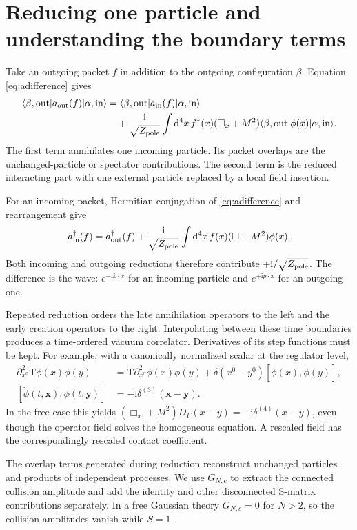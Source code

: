 \documentclass[11pt]{article}
\newcommand{\dd}{\mathrm d}
\newcommand{\ii}{\mathrm i}
\newcommand{\Tord}{\mathrm T}
\newcommand{\module}[1]{\clearpage\section{#1}}
\newcommand{\Zp}{Z_{\rm pole}}
\begin{document}
\module{Reducing one particle and understanding the boundary terms}
Take an outgoing packet \(f\) in addition to the outgoing configuration
\(\beta\). Equation \eqref{eq:adifference} gives
\begin{align}
 \langle\beta,\mathrm{out}|a_{\rm out}(f)|\alpha,\mathrm{in}\rangle
 &=\langle\beta,\mathrm{out}|a_{\rm in}(f)|\alpha,\mathrm{in}\rangle\notag\\
 &\quad+\frac{\ii}{\sqrt{\Zp}}\int\dd^4x\,f^*(x)
 (\Box_x+M^2)\langle\beta,\mathrm{out}|\phi(x)|\alpha,\mathrm{in}\rangle.
 \label{eq:oneleg}
\end{align}
The first term annihilates one incoming particle. Its packet overlaps are
the unchanged-particle or spectator contributions. The second term is the
reduced interacting part with one external particle replaced by a local
field insertion.

For an incoming packet, Hermitian conjugation of \eqref{eq:adifference}
and rearrangement give
\begin{equation}
 a_{\rm in}^\dagger(f)=a_{\rm out}^\dagger(f)
 +\frac{\ii}{\sqrt{\Zp}}\int\dd^4x\,f(x)(\Box+M^2)\phi(x).
\end{equation}
Both incoming and outgoing reductions therefore contribute \(+\ii/\sqrt{\Zp}\).
The difference is the wave: \(e^{-\ii k\cdot x}\) for an incoming particle
and \(e^{+\ii p\cdot x}\) for an outgoing one.

Repeated reduction orders the late annihilation operators to the left
and the early creation operators to the right. Interpolating between these
time boundaries produces a time-ordered vacuum correlator. Derivatives of
its step functions must be kept. For example, with a canonically normalized
scalar at the regulator level,
\begin{align}
 \partial_{x^0}^2\Tord\phi(x)\phi(y)
 &=\Tord\partial_{x^0}^2\phi(x)\phi(y)
 +\delta(x^0-y^0)[\dot\phi(x),\phi(y)],\\
 [\dot\phi(t,\bm x),\phi(t,\bm y)]&=-\ii\delta^{(3)}(\bm x-\bm y).
\end{align}
In the free case this yields
\((\Box_x+M^2)D_F(x-y)=-\ii\delta^{(4)}(x-y)\), even though the
operator field solves the homogeneous equation. A rescaled field has the
correspondingly rescaled contact coefficient.

\begin{keyidea}
The overlap terms generated during reduction reconstruct unchanged
particles and products of independent processes. We use \(G_{N,c}\) to
extract the connected collision amplitude and add the identity and other
disconnected S-matrix contributions separately. In a free Gaussian theory
\(G_{N,c}=0\) for \(N>2\), so the collision amplitudes vanish while \(S=1\).
\end{keyidea}
\end{document}
